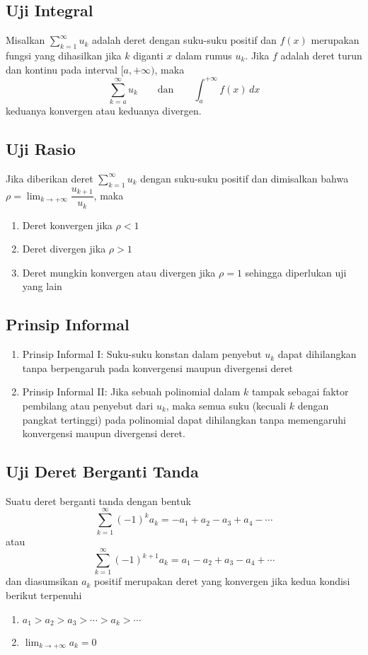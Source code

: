 \documentclass{article}
\begin{document}
\subsection{Uji Integral}
Misalkan $\displaystyle \sum_{k=1}^\infty u_k$ adalah deret dengan suku-suku positif dan $f(x)$ merupakan fungsi yang dihasilkan jika $k$ diganti $x$ dalam rumus $u_k$. Jika $f$ adalah deret turun dan kontinu pada interval $[a,+\infty)$, maka 
$$ \sum_{k=a}^\infty u_k \qquad\text{dan}\qquad \int_a^{+\infty} f(x)\, dx $$
keduanya konvergen atau keduanya divergen. 
\subsection{Uji Rasio}
Jika diberikan deret $\displaystyle \sum_{k=1}^\infty u_k$ dengan suku-suku positif dan dimisalkan bahwa $\displaystyle \rho = \lim_{k\rightarrow +\infty} \dfrac{u_{k+1}}{u_k}$, maka 
\begin{enumerate}
	\item Deret konvergen jika $\rho<1$
	\item Deret divergen jika $\rho>1$
	\item Deret mungkin konvergen atau divergen jika $\rho=1$ sehingga diperlukan uji yang lain
\end{enumerate}
\subsection{Prinsip Informal}
\begin{enumerate}
	\item Prinsip Informal I: Suku-suku konstan dalam penyebut $u_k$ dapat dihilangkan tanpa berpengaruh pada konvergensi maupun divergensi deret
	\item Prinsip Informal II: Jika sebuah polinomial dalam $k$ tampak sebagai faktor pembilang atau penyebut dari $u_k$, maka semua suku (kecuali $k$ dengan pangkat tertinggi) pada polinomial dapat dihilangkan tanpa memengaruhi konvergensi maupun divergensi deret.
\end{enumerate}
\subsection{Uji Deret Berganti Tanda}
Suatu deret berganti tanda dengan bentuk 
$$ \sum_{k=1}^\infty (-1)^k a_k = -a_1+a_2-a_3+a_4-\cdots $$
atau 
$$ \sum_{k=1}^\infty (-1)^{k+1} a_k = a_1-a_2+a_3-a_4+\cdots $$
dan diasumsikan $a_k$ positif merupakan deret yang konvergen jika kedua kondisi berikut terpenuhi
\begin{enumerate}
	\item $a_1>a_2>a_3>\cdots >a_k>\cdots$
	\item $\displaystyle \lim_{k\rightarrow +\infty} a_k = 0$
\end{enumerate}
\end{document}
